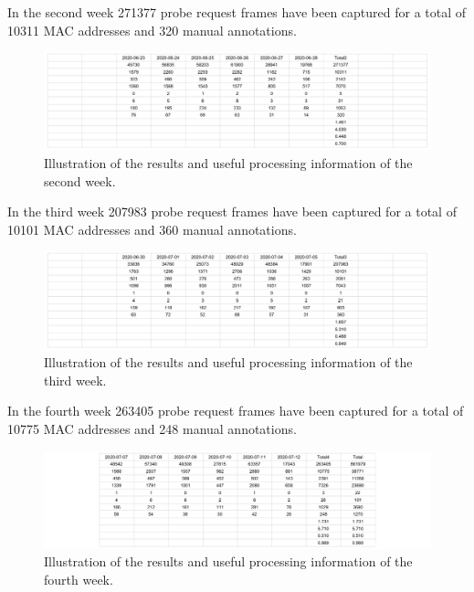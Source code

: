 In the second week 271377 probe request frames have been captured for a total of 10311 MAC addresses and 320 manual annotations.

\begin{figure}[H]
\centering 
\includegraphics[width=1\textwidth]{images/testresults2} 
\caption{Illustration of the results and useful processing information of the second week.}
\label{fig:testresults2}
\end{figure}

In the third week 207983 probe request frames have been captured for a total of 10101 MAC addresses and 360 manual annotations.

\begin{figure}[H]
\centering 
\includegraphics[width=1\textwidth]{images/testresults3} 
\caption{Illustration of the results and useful processing information of the third week.}
\label{fig:testresults3}
\end{figure}

In the fourth week 263405 probe request frames have been captured for a total of 10775 MAC addresses and 248 manual annotations.

\begin{figure}[H]
\centering 
\includegraphics[width=1\textwidth]{images/testresults4} 
\caption{Illustration of the results and useful processing information of the fourth week.}
\label{fig:testresults4}
\end{figure}

